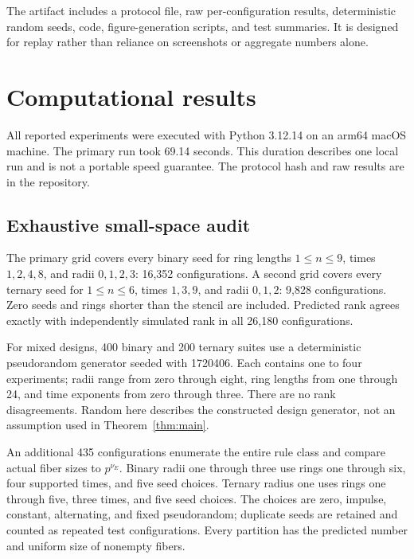 \documentclass[11pt]{article}
\begin{document}
The artifact includes a protocol file, raw per-configuration results, deterministic random seeds, code, figure-generation scripts, and test summaries. It is designed for replay rather than reliance on screenshots or aggregate numbers alone.

\section{Computational results}
All reported experiments were executed with Python 3.12.14 on an arm64 macOS machine. The primary run took 69.14 seconds. This duration describes one local run and is not a portable speed guarantee. The protocol hash and raw results are in the repository.

\subsection{Exhaustive small-space audit}
The primary grid covers every binary seed for ring lengths $1\leq n\leq9$, times $1,2,4,8$, and radii $0,1,2,3$: 16,352 configurations. A second grid covers every ternary seed for $1\leq n\leq6$, times $1,3,9$, and radii $0,1,2$: 9,828 configurations. Zero seeds and rings shorter than the stencil are included. Predicted rank agrees exactly with independently simulated rank in all 26,180 configurations.

For mixed designs, 400 binary and 200 ternary suites use a deterministic pseudorandom generator seeded with 1720406. Each contains one to four experiments; radii range from zero through eight, ring lengths from one through 24, and time exponents from zero through three. There are no rank disagreements. Random here describes the constructed design generator, not an assumption used in Theorem~\ref{thm:main}.

An additional 435 configurations enumerate the entire rule class and compare actual fiber sizes to $p^{\nu_E}$. Binary radii one through three use rings one through six, four supported times, and five seed choices. Ternary radius one uses rings one through five, three times, and five seed choices. The choices are zero, impulse, constant, alternating, and fixed pseudorandom; duplicate seeds are retained and counted as repeated test configurations. Every partition has the predicted number and uniform size of nonempty fibers.
\end{document}
